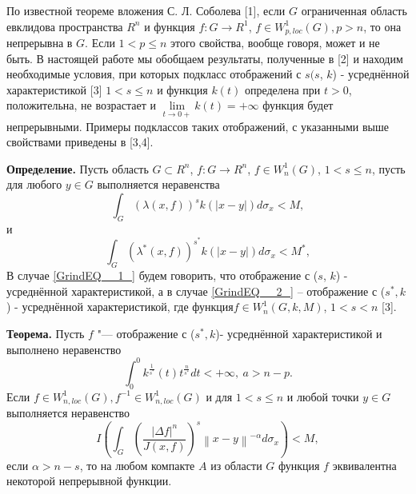 \vzmscaption

По известной теореме вложения С. Л. Соболева [1], если $G$ ограниченная область евклидова пространства $R^{n}$ и функция $f:G\to R^{1}$,
$f\in W_{p,loc}^{1} \left(G\right),p>n$, то она непрерывна в $G$. Если $1<p\leqslant n$ этого свойства, вообще говоря, может и не быть. В настоящей работе мы обобщаем результаты,
полученные в [2] и находим необходимые условия, при которых подкласс отображений с $s($$s$, $k$) - усреднённой характеристикой [3] $1<s\leqslant n$ и функция $k\left(t\right)$ определена при $t>0$,
положительна, не возрастает и ${\mathop{\lim}\limits_{t\to 0+}} k\left(t\right)=+\infty$ функция будет непрерывными. Примеры подклассов таких отображений, с указанными выше свойствами приведены в [3,4]. 

\textbf{Определение.} Пусть область $G\subset R^{n}$, $f:G\to R^{n}$, $f\in W_{n}^{1} \left(G\right)$, $1<s\leqslant n$, пусть для любого $y\in G$ выполняется неравенства 
\begin{equation} \label{GrindEQ__1_} 
    \int_{G}\left(\lambda (x,f)\right)^{s} k\left(\left|x-y\right|\right)d\sigma _{x} < M,
\end{equation} 
и
\begin{equation} \label{GrindEQ__2_} 
    \int _{G}\left(\lambda ^{*} (x,f)\right)^{s^{*} }  k\left(\left|x-y\right|\right)d\sigma _{x} <M^{*},
\end{equation} 
В случае \ref{GrindEQ__1_} будем говорить, что отображение с ($s$, $k$) - усреднённой характеристикой,
а в случае \ref{GrindEQ__2_} -- отображение с ($s^{*} ,k$) - усреднённой характеристикой, где функция\linebreak$f\in W_{n}^{1} \left(G,k,M\right)$, $1<s<n$ [3].

\textbf{Теорема.} Пусть $f$ "--- отображение с ($s^{*} ,k$)- усреднённой характеристикой и выполнено неравенство 
\begin{equation} \label{GrindEQ__3_} 
    \int_{0}^{0}k^{\frac{1}{s^{*} } } \left(t\right) t^{\frac{n}{s^{*} } } dt<+\infty, \ a>n-p.
\end{equation}
Если $f\in W_{n,loc}^{1} \left(G\right),f^{-1} \in W_{n,loc}^{1} \left(G\right)$ и для $1<s\leqslant n$ и любой точки $y\in G$выполняется неравенство 
\begin{equation} \label{GrindEQ__4_}
    I\left(\int _{G}\left(\frac{\left|\Delta f\right|^{n} }{J\left(x,f\right)} \right)^{s} \left\| x-y\right\| ^{-\alpha } d\sigma _{x} \right)<M,
\end{equation}
если $\alpha >n-s$, то на любом компакте $A$ из области $G$ функция $f$ эквивалентна некоторой непрерывной функции.

